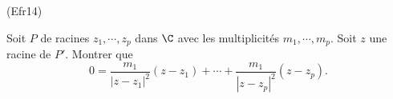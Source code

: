 \begin{tiny}(Efr14)\end{tiny} Soit $P$ de racines $z_1,\cdots, z_p$ dans $\C$ avec les multiplicités $m_1,\cdots, m_p$. Soit $z$ une racine de $P'$. Montrer que
\[
 0 = \frac{m_1}{|z - z_1|^2}(z-z_1) + \cdots + \frac{m_1}{|z - z_p|^2}(z-z_p).
\]
